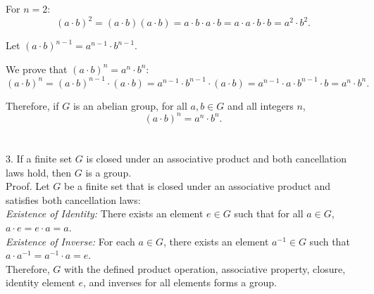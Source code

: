 For \( n = 2 \):
\[ (a \cdot b)^2 = (a \cdot b)(a \cdot b) = a \cdot b \cdot a \cdot b = a \cdot a \cdot b \cdot b = a^2 \cdot b^2. \]

Let \( (a \cdot b)^{n-1} = a^{n-1} \cdot b^{n-1} \).

We prove that \( (a \cdot b)^n = a^n \cdot b^n \):
\[ (a \cdot b)^n = (a \cdot b)^{n-1} \cdot (a \cdot b) = a^{n-1} \cdot b^{n-1} \cdot (a \cdot b) = a^{n-1} \cdot a \cdot b^{n-1} \cdot b = a^n \cdot b^n. \]

Therefore, if \( G \) is an abelian group, for all \( a, b \in G \) and all integers \( n \),
\[ (a \cdot b)^n = a^n \cdot b^n. \]
\\\\
3. If a finite set \( G \) is closed under an associative product and both cancellation laws hold, then \( G \) is a group.
\\
{Proof.}
Let \( G \) be a finite set that is closed under an associative product and satisfies both cancellation laws:
\\
\textit{Existence of Identity:} There exists an element \( e \in G \) such that for all \( a \in G \), \( a \cdot e = e \cdot a = a \).
  \\  
\textit{Existence of Inverse:} For each \( a \in G \), there exists an element \( a^{-1} \in G \) such that \( a \cdot a^{-1} = a^{-1} \cdot a = e \).
\\
Therefore, \( G \) with the defined product operation, associative property, closure, identity element \( e \), and inverses for all elements forms a group.


